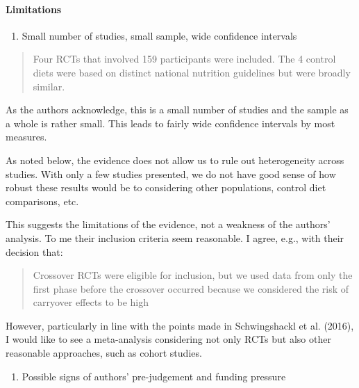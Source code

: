 \documentclass[]{tufte-handout}
\providecommand{\tightlist}{%
  \setlength{\itemsep}{0pt}\setlength{\parskip}{0pt}}
\begin{document}
\hypertarget{limitations}{%
\paragraph{Limitations}\label{limitations}}

\begin{enumerate}
\def\labelenumi{\arabic{enumi}.}
\tightlist
\item
  Small number of studies, small sample, wide confidence intervals
\end{enumerate}

\begin{quote}
Four RCTs that involved 159 participants were included. The 4 control
diets were based on distinct national nutrition guidelines but were
broadly similar.
\end{quote}

As the authors acknowledge, this is a small number of studies and the
sample as a whole is rather small. This leads to fairly wide confidence
intervals by most measures.

As noted below, the evidence does not allow us to rule out heterogeneity
across studies. With only a few studies presented, we do not have good
sense of how robust these results would be to considering other
populations, control diet comparisons, etc.


This suggests the limitations of the evidence, not a weakness of the
authors' analysis. To me their inclusion criteria seem reasonable. I
agree, e.g., with their decision that:

\begin{quote}
Crossover RCTs were eligible for inclusion, but we used data from only
the first phase before the crossover occurred because we considered the
risk of carryover effects to be high
\end{quote}

However, particularly in line with the points made in Schwingshackl et
al. (2016), I would like to see a meta-analysis considering not only
RCTs but also other reasonable approaches, such as cohort studies.


\begin{enumerate}
\def\labelenumi{\arabic{enumi}.}
\setcounter{enumi}{1}
\tightlist
\item
  Possible signs of authors' pre-judgement and funding pressure
\end{enumerate}
\end{document}

